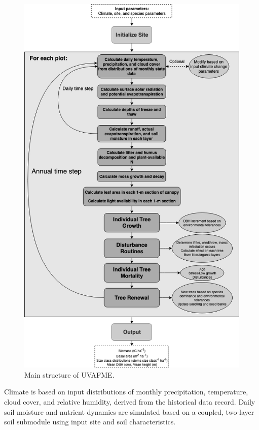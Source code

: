 \documentclass[a4paper, 12pt] {report}
\begin{document}
\begin{figure}
  \includegraphics[width=\linewidth]{Figures/UVAFME_MainSchematic.png}
  \caption{Main structure of UVAFME.}
  \label{fig:maindiagram}
\end{figure}

Climate is based on input distributions of monthly precipitation, temperature, cloud cover, and relative humidity, derived from the historical data record. Daily soil moisture and nutrient dynamics are simulated based on a coupled, two-layer soil submodule using input site and soil characteristics.
\end{document}
